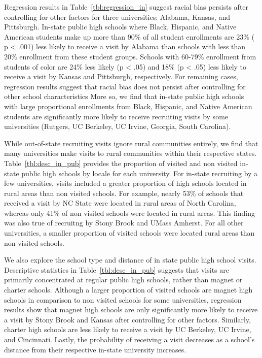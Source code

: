 \documentclass[twoside]{article}
\begin{document}
Regression results in Table~\ref{tbl:regression_in} suggest racial bias persists after controlling for other factors for three universities: Alabama, Kansas, and Pittsburgh. In-state public high schools where Black, Hispanic, and Native American students make up more than  90\% of all student enrollments are 23\% ( p < .001) less likely to receive a visit by Alabama than schools with less than 20\% enrollment from these student groups. Schools with 60-79\% enrollment from students of color are 24\% less likely (p < .05) and 18\% (p < .05) less likely to receive a visit by Kansas and Pittsburgh, respectively. For remaining cases, regression results suggest that racial bias does not persist after controlling for other school characteristics More so, we find that in-state public high schools with large proportional enrollments from Black, Hispanic, and Native American students are significantly more likely to receive recruiting visits by some universities (Rutgers, UC Berkeley, UC Irvine, Georgia, South Carolina).

While out-of-state recruiting visits ignore rural communities entirely, we find that many universities make visits to rural communities within their respective states. Table~\ref{tbl:desc_in_pub} provides the proportion of visited and non visited in-state public high schools by locale for each university. For in-state recruiting by a few universities, visits included a greater proportion of high schools located in rural areas than non visited schools. For example, nearly 53\% of schools that received a visit by NC State were located in rural areas of North Carolina, whereas only 41\% of non visited schools were located in rural areas. This finding was also true of recruitng by Stony Brook and UMass Amherst. For all other universities, a smaller proportion of visited schools were located rural areas than non visited schools. 

We also explore the school type and distance of in state public high school visits. Descriptive statistics in Table~\ref{tbl:desc_in_pub} suggests that visits are primarily concentrated at regular public high schools, rather than magnet or charter schools. Although a larger proportion of visited schools are magnet high schools in comparison to non visited schools for some universities, regression results show that magnet high schools are only significantly more likely to receive a visit by Stony Brook and Kansas after controlling for other factors. Similarly, charter high schools are less likely to receive a visit by UC Berkeley, UC Irvine, and Cincinnati.  Lastly, the probability of receiving a visit decreases as a school’s distance from their respective in-state university increases.
\end{document}

